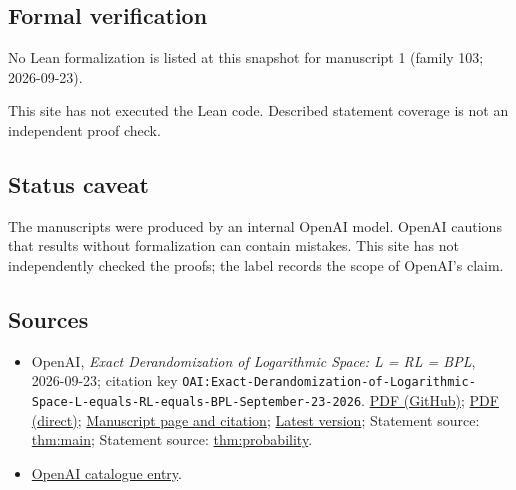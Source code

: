 \documentclass[11pt]{article}
\begin{document}
\subsection{Formal verification}
No Lean formalization is listed at this snapshot for manuscript 1 (family 103; 2026-09-23).

This site has not executed the Lean code. Described statement coverage is not an independent proof check.

\subsection{Status caveat}
The manuscripts were produced by an internal OpenAI model. OpenAI cautions that results without formalization can contain mistakes. This site has not independently checked the proofs; the label records the scope of OpenAI's claim.

\subsection{Sources}
\begin{itemize}
\item OpenAI, \emph{Exact Derandomization of Logarithmic Space: L = RL = BPL}, 2026-09-23; citation key \texttt{OAI:Exact-Derandomization-of-Logarithmic-Space-L-equals-RL-equals-BPL-September-23-2026}. \href{https://github.com/openai/math/blob/adc7f1241b42e322a6451854ab7e4b4c146bf78a/preprints/Exact-Derandomization-of-Logarithmic-Space-L-equals-RL-equals-BPL-September-23-2026/paper.pdf}{PDF (GitHub)}; \href{https://github.com/openai/math/raw/adc7f1241b42e322a6451854ab7e4b4c146bf78a/preprints/Exact-Derandomization-of-Logarithmic-Space-L-equals-RL-equals-BPL-September-23-2026/paper.pdf}{PDF (direct)}; \href{https://github.com/openai/math/blob/adc7f1241b42e322a6451854ab7e4b4c146bf78a/preprints/Exact-Derandomization-of-Logarithmic-Space-L-equals-RL-equals-BPL-September-23-2026/README.md}{Manuscript page and citation}; \href{https://github.com/openai/math/blob/main/preprints/Exact-Derandomization-of-Logarithmic-Space-L-equals-RL-equals-BPL-September-23-2026/paper.pdf}{Latest version}; Statement source: \href{https://github.com/openai/math/blob/adc7f1241b42e322a6451854ab7e4b4c146bf78a/preprints/Exact-Derandomization-of-Logarithmic-Space-L-equals-RL-equals-BPL-September-23-2026/build/sections/introduction.tex\#L28}{thm:main}; Statement source: \href{https://github.com/openai/math/blob/adc7f1241b42e322a6451854ab7e4b4c146bf78a/preprints/Exact-Derandomization-of-Logarithmic-Space-L-equals-RL-equals-BPL-September-23-2026/build/sections/introduction.tex\#L40}{thm:probability}.
\item \href{https://github.com/openai/math/blob/adc7f1241b42e322a6451854ab7e4b4c146bf78a/CONTENTS.md}{OpenAI catalogue entry}.
\end{itemize}
\end{document}
